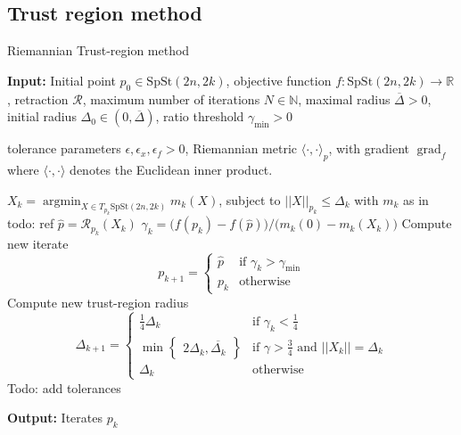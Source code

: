 \subsection{Trust region method}


\begin{algorithm}[H]
    \caption{Riemannian Trust-region method}\label{alg:grad_descent}
    \textbf{Input:} Initial point $p_{0}\in \mathrm{SpSt}(2n, 2k)$, objective function $f\colon\mathrm{SpSt}(2n, 2k)\to \mathbb{R}$, retraction $\mathcal{R}$, maximum number of iterations $N\in \mathbb{N}$,  maximal radius $\overline{\Delta}>0$, initial radius $\Delta_{0}\in(0,\overline{\Delta})$, ratio threshold $\gamma_{\text{min}}>0$

    tolerance parameters $\epsilon, \epsilon_{x}, \epsilon_{f}>0$, Riemannian metric $\langle \cdot,\cdot \rangle_{p}$, with gradient $\operatorname*{grad}_{f}$ where $\langle \cdot,\cdot \rangle$ denotes the Euclidean inner product.
    \begin{algorithmic}[1]
        \State $X_{k}=\operatorname*{arg min}_{X\in T_{p_{k}}\mathrm{SpSt}(2n, 2k)}m_{k}(X)$, subject to $\lvert \lvert X \rvert  \rvert _{p_{k}}\leq \Delta_{k}$ with $m_{k}$ as in todo: ref
        \State $\hat{p}=\mathcal{R}_{p_{k}}(X_{k})$
        \State $\gamma_{k}=\big(f(p_{k})-f(\hat{p})\big)/\big(m_{k}(0)-m_{k}(X_{k})\big)$
        \State Compute new iterate\begin{equation*}
            p_{k+1}=
            \begin{cases}
            \hat{p} & \text{if }\gamma_{k}>\gamma_{\text{min}} \\
            p_{k}  & \text{otherwise}
            \end{cases}
            \end{equation*}
        \State Compute new trust-region radius\begin{equation*}
    \Delta_{k+1}=
    \begin{cases}
    \frac{1}{4}\Delta_{k} & \text{if }\gamma_{k}<\frac{1}{4} \\
    \operatorname{min}\begin{Bmatrix}2\Delta_{k},\overline{\Delta_{k}}\end{Bmatrix} & \text{if }\gamma>\frac{3}{4}\text{ and }\lvert \lvert X_{k} \rvert  \rvert =\Delta_{k} \\
    \Delta_{k} & \text{otherwise}
    \end{cases}
    \end{equation*}
        \State Todo: add tolerances
    \EndFor
    \end{algorithmic}
    \textbf{Output:} Iterates $p_{k}$
\end{algorithm}